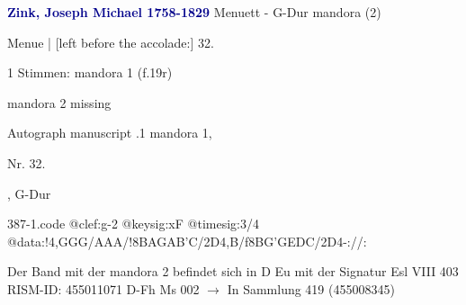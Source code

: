 \documentclass[twocolumn]{book}
\begin{document}
\newline \par \vspace{7pt} \textcolor{darkblue}{\textbf{Zink, Joseph Michael  1758-1829}}
\newline Menuett - G-Dur
\newline mandora (2)
\newline \begin{itshape}[f.19r, at left:] Menue | [left before the accolade:] 32.\end{itshape} 
\newline \textcolor{darkblue}{}  1 Stimmen: mandora 1  (f.19r)
\newline \begin{small} mandora 2 missing\end{small} 
\newline Autograph manuscript
.1  mandora 1, \begin{itshape}Nr. 32.\end{itshape}, G-Dur  
\begin{filecontents*}{387-1.code}
@clef:g-2
@keysig:xF
@timesig:3/4
@data:!4,GGG/AAA/!8BAGAB'C/2D4,B/f8BG'GEDC/2D4-://:
\end{filecontents*}
\newline
%
\newline Der Band mit der mandora 2 befindet sich in D Eu mit der Signatur Esl VIII 403
\newline RISM-ID: 455011071
\newline D-Fh  Ms 002
\newline $\rightarrow$ In Sammlung 419 (455008345)
      
\end{document}
